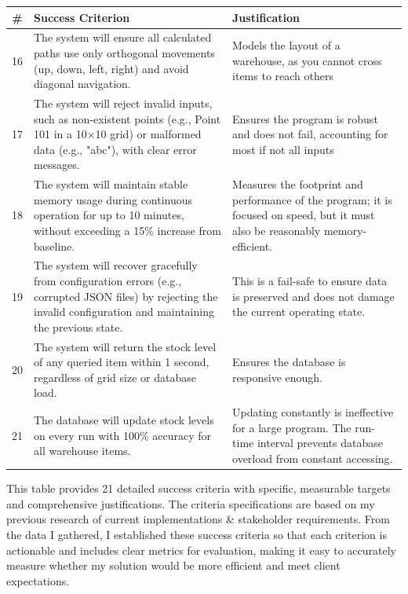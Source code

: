 \begin{table}[htbp]
\centering
\begin{tabularx}{\textwidth}{|c|X|X|}
\hline
\textbf{\#} & \textbf{Success Criterion} & \textbf{Justification} \\
\hline
16 & The system will ensure all calculated paths use only orthogonal movements (up, down, left, right) and avoid diagonal navigation. & Models the layout of a warehouse, as you cannot cross items to reach others \\
\hline
17 & The system will reject invalid inputs, such as non-existent points (e.g., Point 101 in a 10×10 grid) or malformed data (e.g., "abc"), with clear error messages. & Ensures the program is robust and does not fail, accounting for most if not all inputs \\
\hline
18 & The system will maintain stable memory usage during continuous operation for up to 10 minutes, without exceeding a 15\% increase from baseline. & Measures the footprint and performance of the program; it is focused on speed, but it must also be reasonably memory-efficient. \\
\hline
19 & The system will recover gracefully from configuration errors (e.g., corrupted JSON files) by rejecting the invalid configuration and maintaining the previous state. & This is a fail-safe to ensure data is preserved and does not damage the current operating state. \\
\hline
20 & The system will return the stock level of any queried item within 1 second, regardless of grid size or database load. & Ensures the database is responsive enough. \\
\hline
21 & The database will update stock levels on every run with 100\% accuracy for all warehouse items. & Updating constantly is ineffective for a large program. The run-time interval prevents database overload from constant accessing. \\
\hline
\end{tabularx}
\end{table}

\textbf{}
\newline
This table provides 21 detailed success criteria with specific, measurable targets and comprehensive justifications. The criteria specifications are based on my previous research of current implementations \& stakeholder requirements. From the data I gathered, I established these success criteria so that each criterion is actionable and includes clear metrics for evaluation, making it easy to accurately measure whether my solution would be more efficient and meet client expectations.

